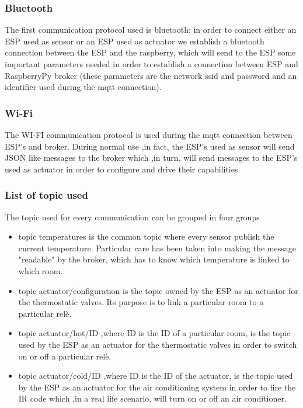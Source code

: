 \documentclass[a4paper]{article}
\begin{document}
        \subsubsection{Bluetooth}
        The first communication protocol used is bluetooth; in order to connect either an ESP used as sensor or an ESP used as actuator we establish a bluetooth connection between the ESP and the raspberry, which will send to the ESP some important parameters needed in order to establish a connection between ESP and RaspberryPy broker (these parameters are the network ssid and password and an identifier used during the mqtt connection).
        
        \subsubsection{Wi-Fi}
        The WI-FI communication protocol is used during the mqtt connection between ESP's and broker. During normal use ,in fact, the ESP's used as sensor will send JSON like messages to the broker which ,in turn, will send messages to the ESP's used as actuator in order to configure and drive their capabilities. 
        
        \subsubsection{List of topic used}
        The topic used for every communication can be grouped in four groups
        \begin{itemize}
            \item topic temperatures is the common topic where every sensor publish the current temperature. Particular care has been taken into making the message "readable" by the broker, which has to know which temperature is linked to which room.
            \item topic actuator/configuration is the topic owned by the ESP as an actuator for the thermostatic valves. Its purpose is to link a particular room to a particular relè.
            \item topic actuator/hot/ID ,where ID is the ID of a particular room, is the topic used by the ESP as an actuator for the thermostatic valves in order to switch on or off a particular relè.
            \item topic actuator/cold/ID ,where ID is the ID of the actuator, is the topic used by the ESP as an actuator for the air conditioning system in order to fire the IR code which ,in a real life scenario, will turn on or off an air conditioner.
        \end{itemize}
        
\end{document}
